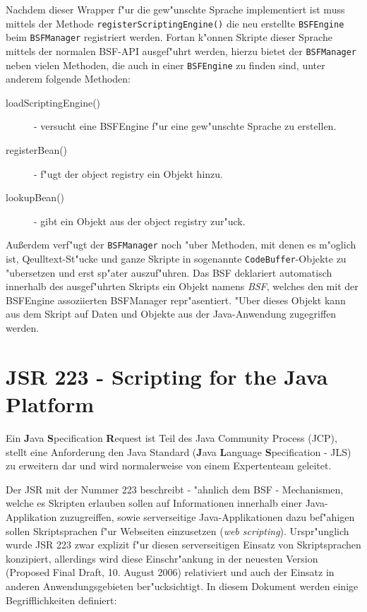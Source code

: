 Nachdem dieser Wrapper f"ur die gew"unschte Sprache implementiert ist muss mittels der Methode \texttt{registerScriptingEngine()} die neu erstellte 
\texttt{BSFEngine} beim \texttt{BSFManager} registriert werden. Fortan k"onnen Skripte dieser Sprache mittels der normalen
BSF-API ausgef"uhrt werden, hierzu bietet der \texttt{BSFManager} neben vielen Methoden, die auch in einer \texttt{BSFEngine} zu finden sind,
unter anderem folgende Methoden:
\begin{description}
    \item[loadScriptingEngine()] - versucht eine BSFEngine f"ur eine gew"unschte Sprache zu erstellen.
    \item[registerBean()] - f"ugt der object registry ein Objekt hinzu.
    \item[lookupBean()] - gibt ein Objekt aus der object registry zur"uck.
\end{description}
Au\ss erdem verf"ugt der \texttt{BSFManager} noch "uber Methoden, mit denen es m"oglich ist, Qeulltext-St"ucke und ganze Skripte in sogenannte
\texttt{CodeBuffer}-Objekte zu "ubersetzen und erst sp"ater auszuf"uhren.
Das BSF deklariert automatisch innerhalb des ausgef"uhrten Skripts ein Objekt namens \emph{BSF}, welches den mit der
BSFEngine assoziierten BSFManager repr"asentiert. "Uber dieses Objekt kann aus dem Skript auf Daten und Objekte aus der
Java-Anwendung zugegriffen werden.

\section{JSR 223 - Scripting for the Java Platform}
\label{sec:javanscripts:jsr}

Ein \textbf{J}ava \textbf{S}pecification \textbf{R}equest ist Teil des Java Community Process (JCP), stellt
eine Anforderung den Java Standard (\textbf{J}ava \textbf{L}anguage \textbf{S}pecification - JLS) zu erweitern dar und wird 
normalerweise von einem Expertenteam geleitet.

Der JSR mit der Nummer 223 \cite{JSRHP} beschreibt - "ahnlich dem BSF - Mechanismen, welche es Skripten erlauben sollen auf Informationen
innerhalb einer Java-Applikation zuzugreiffen, sowie serverseitige Java-Applikationen dazu bef"ahigen sollen Skriptsprachen f"ur Webseiten 
einzusetzen (\emph{web scripting}). Urspr"unglich wurde JSR 223 zwar explizit f"ur diesen serverseitigen Einsatz von Skriptsprachen 
konzipiert, allerdings wird diese Einschr"ankung in der neuesten Version (Proposed Final Draft, 10. August 2006) relativiert
und auch der Einsatz in anderen Anwendungsgebieten ber"ucksichtigt. In diesem Dokument werden einige Begrifflichkeiten definiert:


